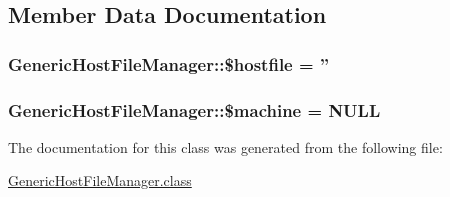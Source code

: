 \subsection{Member Data Documentation}
\hypertarget{classGenericHostFileManager_aa1c75ec37f6a79c0e9c2de867ad09927}{
\subsubsection[{\$hostfile}]{\setlength{\rightskip}{0pt plus 5cm}Generic\-Host\-File\-Manager\-::\$hostfile = ''\hspace{0.3cm}{\ttfamily [private]}}}\label{classGenericHostFileManager_aa1c75ec37f6a79c0e9c2de867ad09927}
\hypertarget{classGenericHostFileManager_a3c7555c9307dee9fd43dd9b06f6f46a6}{
\subsubsection[{\$machine}]{\setlength{\rightskip}{0pt plus 5cm}Generic\-Host\-File\-Manager\-::\$machine = N\-U\-L\-L\hspace{0.3cm}{\ttfamily [private]}}}\label{classGenericHostFileManager_a3c7555c9307dee9fd43dd9b06f6f46a6}


The documentation for this class was generated from the following file\-:\begin{DoxyCompactItemize}
\item 
\hyperlink{GenericHostFileManager_8class}{Generic\-Host\-File\-Manager.\-class}\end{DoxyCompactItemize}
